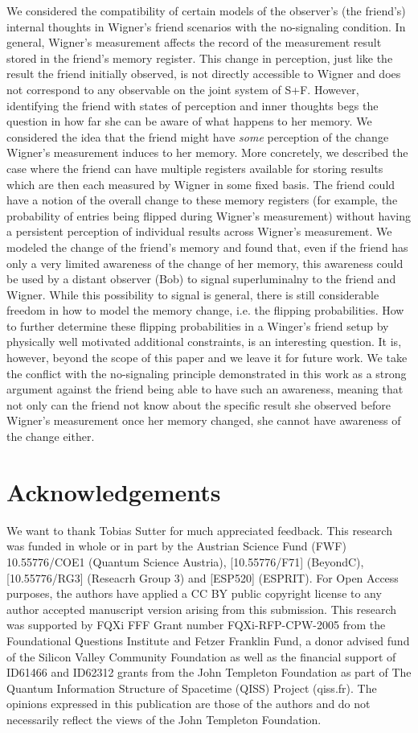 \documentclass[a4paper,twocolumn,11pt,accepted=2017-05-09,dvipsnames]{quantumarticle}
\numberwithin{equation}{section}
\begin{document}
We considered the compatibility of certain models of the observer's (the friend's) internal thoughts in Wigner's friend scenarios with the no-signaling condition. In general, Wigner's measurement affects the record of the measurement result stored in the friend's memory register. This change in perception, just like the result the friend initially observed, is not directly accessible to Wigner and does not correspond to any observable on the joint system of S+F. However, identifying the friend with states of perception and inner thoughts begs the question in how far she can be aware of what happens to her memory. We considered the idea that the friend might have \emph{some} perception of the change Wigner's measurement induces to her memory. More concretely, we described the case where the friend can have multiple registers available for storing results which are then each measured by Wigner in some fixed basis. The friend could have a notion of the overall change to these memory registers (for example, the probability of entries being flipped during Wigner's measurement) without having a persistent perception of individual results across Wigner's measurement.
We modeled the change of the friend's memory and found that, even if the friend has only a very limited awareness of the change of her memory, this awareness could be used by a distant observer (Bob) to signal superluminalny to the friend and Wigner. While this possibility to signal is general, there is still considerable freedom in how to model the memory change, i.e. the flipping probabilities. How to further determine these flipping probabilities in a Winger's friend setup by physically well motivated additional constraints, is an interesting question. It is, however, beyond the scope of this paper and we leave it for future work. We take the conflict with the no-signaling principle demonstrated in this work as a strong argument against the friend being able to have such an awareness, meaning that not only can the friend not know about the specific result she observed before Wigner's measurement once her memory changed, she cannot have awareness of the change either. 

\section*{Acknowledgements}
We want to thank Tobias Sutter for much appreciated feedback. This research was funded in whole or in part by the Austrian Science Fund (FWF) 10.55776/COE1 (Quantum Science Austria), [10.55776/F71] (BeyondC), [10.55776/RG3] (Reseacrh Group 3) and [ESP520] (ESPRIT). For Open Access purposes, the authors have applied a CC BY public copyright license to any author accepted manuscript version arising from this submission. This research was supported by FQXi FFF Grant number FQXi-RFP-CPW-2005 from the Foundational Questions Institute and Fetzer Franklin Fund, a donor advised fund of  the Silicon Valley Community Foundation as well as the financial support of ID61466 and ID62312 grants from the John Templeton Foundation as part of The Quantum Information Structure of Spacetime (QISS) Project (qiss.fr). The opinions expressed in this publication are those of the authors and do not necessarily reflect the views of the John Templeton Foundation.
\newpage
\end{document}
